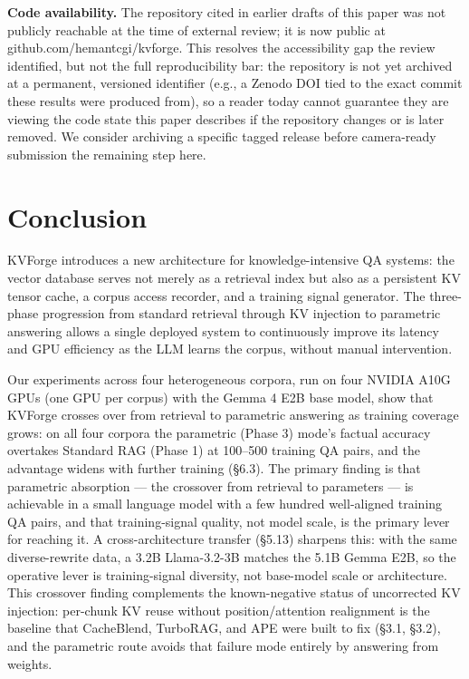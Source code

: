 \documentclass[10pt,twocolumn]{article}
\begin{document}
\textbf{Code availability.} The repository cited in earlier drafts of this paper was not publicly reachable at the time of external review; it is now public at github.com/hemantcgi/kvforge. This resolves the accessibility gap the review identified, but not the full reproducibility bar: the repository is not yet archived at a permanent, versioned identifier (e.g., a Zenodo DOI tied to the exact commit these results were produced from), so a reader today cannot guarantee they are viewing the code state this paper describes if the repository changes or is later removed. We consider archiving a specific tagged release before camera-ready submission the remaining step here.



\smallskip

\section{Conclusion}

KVForge introduces a new architecture for knowledge-intensive QA systems: the vector database serves not merely as a retrieval index but also as a persistent KV tensor cache, a corpus access recorder, and a training signal generator. The three-phase progression from standard retrieval through KV injection to parametric answering allows a single deployed system to continuously improve its latency and GPU efficiency as the LLM learns the corpus, without manual intervention.


Our experiments across four heterogeneous corpora, run on four NVIDIA A10G GPUs (one GPU per corpus) with the Gemma 4 E2B base model, show that KVForge crosses over from retrieval to parametric answering as training coverage grows: on all four corpora the parametric (Phase 3) mode's factual accuracy overtakes Standard RAG (Phase 1) at 100--500 training QA pairs, and the advantage widens with further training (\S{}6.3). The primary finding is that parametric absorption --- the crossover from retrieval to parameters --- is achievable in a small language model with a few hundred well-aligned training QA pairs, and that training-signal quality, not model scale, is the primary lever for reaching it. A cross-architecture transfer (\S{}5.13) sharpens this: with the same diverse-rewrite data, a 3.2B Llama-3.2-3B matches the 5.1B Gemma E2B, so the operative lever is training-signal diversity, not base-model scale or architecture. This crossover finding complements the known-negative status of uncorrected KV injection: per-chunk KV reuse without position/attention realignment is the baseline that CacheBlend, TurboRAG, and APE were built to fix (\S{}3.1, \S{}3.2), and the parametric route avoids that failure mode entirely by answering from weights.
\end{document}
